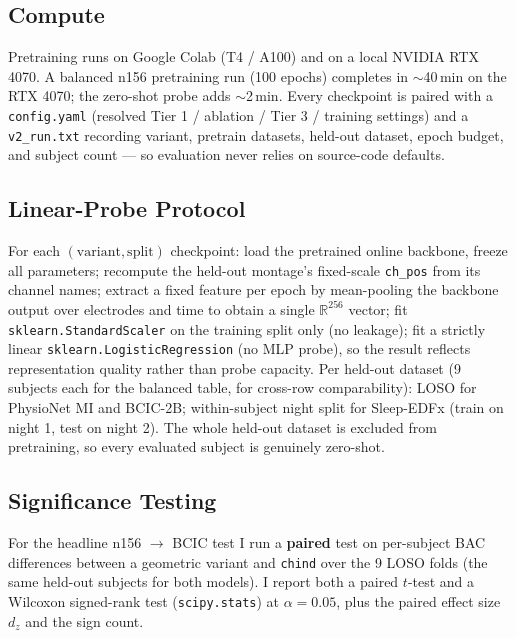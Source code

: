 \documentclass[11pt]{article}
\begin{document}
\subsection{Compute}
\label{sec:setup:compute}

Pretraining runs on Google Colab (T4 / A100) and on a local NVIDIA RTX 4070.
A balanced n156 pretraining run (100 epochs) completes in $\sim$40\,min on
the RTX 4070; the zero-shot probe adds $\sim$2\,min. Every checkpoint is
paired with a \texttt{config.yaml} (resolved Tier 1 / ablation / Tier 3 /
training settings) and a \texttt{v2\_run.txt} recording variant, pretrain
datasets, held-out dataset, epoch budget, and subject count --- so
evaluation never relies on source-code defaults.

\subsection{Linear-Probe Protocol}
\label{sec:setup:probe}

For each $(\text{variant}, \text{split})$ checkpoint: load the pretrained
online backbone, freeze all parameters; recompute the held-out montage's
fixed-scale \texttt{ch\_pos} from its channel names; extract a fixed feature
per epoch by mean-pooling the backbone output over electrodes and time to
obtain a single $\mathbb{R}^{256}$ vector; fit
\texttt{sklearn.StandardScaler} on the training split only (no leakage); fit
a strictly linear \texttt{sklearn.LogisticRegression} (no MLP probe), so the
result reflects representation quality rather than probe capacity. Per
held-out dataset (9 subjects each for the balanced table, for cross-row
comparability): LOSO for PhysioNet MI and BCIC-2B; within-subject
night split for Sleep-EDFx (train on night 1, test on night 2). The whole
held-out dataset is excluded from pretraining, so every evaluated subject is
genuinely zero-shot.

\subsection{Significance Testing}
\label{sec:setup:stats}

For the headline n156 $\to$ BCIC test I run a \textbf{paired} test on
per-subject BAC differences between a geometric variant and \texttt{chind}
over the 9 LOSO folds (the same held-out subjects for both models). I report
both a paired $t$-test and a Wilcoxon signed-rank test
(\texttt{scipy.stats}) at $\alpha = 0.05$, plus the paired effect size $d_z$
and the sign count.
\end{document}
